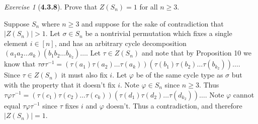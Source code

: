 \documentclass[12pt]{amsart}
\makeatletter
\theoremstyle{remark}
\newtheorem*{exercise}{Exercise}%
\renewenvironment{proof}[1][\proofname]{\par\doublespacing
  \pushQED{\qed}%
  \normalfont \topsep6\p@\@plus6\p@\relax
  \list{}{%
    \settowidth{\leftmargin}{\itshape\proofname:\hskip\labelsep}%
    \setlength{\labelwidth}{0pt}%
    \setlength{\itemindent}{-\leftmargin}%
  }%
  \item[\hskip\labelsep\itshape#1\@addpunct{:}]\ignorespaces
}{%
  \popQED\endlist\@endpefalse
  \singlespacing
}
\theoremstyle{mycomment}
\makeatother
\begin{document}
\begin{exercise}[\textbf{4.3.8}] Prove that $Z(S_n) = 1$ for all $n \geq 3$. 
  \begin{proof} Suppose $S_n$ where $n \geq 3$ and suppose for the sake of contradiction that $|Z(S_n)| > 1$. Let $\sigma \in S_n$ be a nontrivial permutation which fixes a single element $i \in [n]$, and has an arbitrary cycle decomposition $(a_1a_2\dots a_k)(b_1b_2\dots b_{k_2})\dots$. Let $\tau \in Z(S_n)$ and note that by Proposition 10 we know that $\tau \sigma \tau^{-1} = (\tau(a_1)\tau(a_2)\dots \tau(a_k))(\tau(b_1)\tau(b_2)\dots \tau(b_{k_2}))\dots$. Since $\tau \in Z(S_n)$ it must also fix $i$. Let $\varphi$ be of the same cycle type as $\sigma$ but with the property that it doesn't fix $i$. Note $\varphi \in S_n$ since $n \geq 3$. Thus $\tau \varphi \tau^{-1} = (\tau(c_1)\tau(c_2)\dots \tau(c_k))(\tau(d_1)\tau(d_2)\dots \tau(d_{k_2}))\dots$. Note $\varphi$ cannot equal $\tau \varphi \tau^{-1}$ since $\tau$ fixes $i$ and $\varphi$ doesn't. Thus a contradiction, and therefore $|Z(S_n)| = 1$.
  \end{proof}
\end{exercise}
\vspace{.15in}
\end{document}
